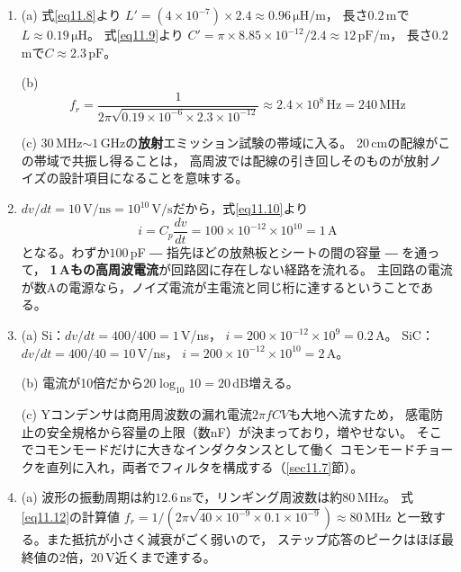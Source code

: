 \begin{enumerate}
(b) $10^{60/20} = 10^3\,\mathrm{\mu V} = 1$\,mV。

(c) $54 - 30 = 24$\,dBの減衰が必要。電圧比では
$10^{24/20} = 10^{1.2} \approx 16$，すなわち約$1/16$に減らすフィルタが要る。

\item[\ref{ex11.5}]
(a) 式\ref{eq11.8}より
$L' = (4\times10^{-7}) \times 2.4 \approx 0.96\,\mathrm{\mu H/m}$，
長さ$0.2$\,mで$L \approx 0.19\,\mathrm{\mu H}$。
式\ref{eq11.9}より
$C' = \pi \times 8.85\times10^{-12} / 2.4 \approx 12\,\mathrm{pF/m}$，
長さ$0.2$\,mで$C \approx 2.3\,\mathrm{pF}$。

(b)
\begin{equation*}
f_r = \frac{1}{2\pi\sqrt{0.19\times10^{-6} \times 2.3\times10^{-12}}}
\approx 2.4\times10^{8}\,\mathrm{Hz} = 240\,\mathrm{MHz}
\end{equation*}

(c) $30$\,MHz$\sim$$1$\,GHzの\textbf{放射}エミッション試験の帯域に入る。
20\,cmの配線がこの帯域で共振し得ることは，
高周波では配線の引き回しそのものが放射ノイズの設計項目になることを意味する。

\item[\ref{ex11.6}]
$dv/dt = 10\,\mathrm{V/ns} = 10^{10}\,\mathrm{V/s}$だから，式\ref{eq11.10}より
\begin{equation*}
i = C_p \frac{dv}{dt} = 100\times10^{-12} \times 10^{10} = 1\,\mathrm{A}
\end{equation*}
となる。わずか$100$\,pF ― 指先ほどの放熱板とシートの間の容量 ― を通って，
\textbf{1\,Aもの高周波電流}が回路図に存在しない経路を流れる。
主回路の電流が数Aの電源なら，ノイズ電流が主電流と同じ桁に達するということである。

\item[\ref{ex11.7}]
(a) Si：$dv/dt = 400/400 = 1$\,V/ns，
$i = 200\times10^{-12} \times 10^9 = 0.2$\,A。
SiC：$dv/dt = 400/40 = 10$\,V/ns，
$i = 200\times10^{-12} \times 10^{10} = 2$\,A。

(b) 電流が10倍だから$20\log_{10}10 = 20$\,dB増える。

(c) Yコンデンサは商用周波数の漏れ電流$2\pi f C V$も大地へ流すため，
感電防止の安全規格から容量の上限（数nF）が決まっており，増やせない。
そこでコモンモードだけに大きなインダクタンスとして働く
コモンモードチョークを直列に入れ，両者でフィルタを構成する（\ref{sec11.7}節）。

\item[\ref{ex11.8}]
(a) 波形の振動周期は約$12.6$\,nsで，リンギング周波数は約$80$\,MHz。
式\ref{eq11.12}の計算値
$f_r = 1/(2\pi\sqrt{40\times10^{-9} \times 0.1\times10^{-9}}) \approx 80$\,MHz
と一致する。また抵抗が小さく減衰がごく弱いので，
ステップ応答のピークはほぼ最終値の2倍，$20$\,V近くまで達する。


\end{enumerate}
